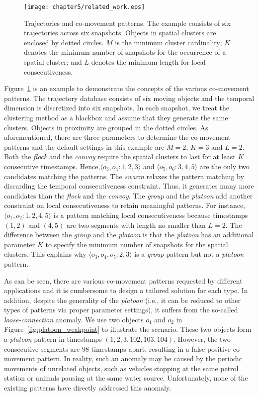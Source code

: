 \begin{figure}[h]
\centering
\texttt{[image: chapter5/related\_work.eps]}
\caption{Trajectories and co-movement patterns. The example consists of six trajectories across six snapshots. Objects in spatial clusters are enclosed by dotted circles. $M$ is the minimum cluster cardinality; $K$ denotes the minimum number of snapshots for the occurrence of a spatial cluster; and $L$ denotes the minimum length for local consecutiveness.}
\label{fig:related_work}
\end{figure}

Figure~\ref{fig:related_work} is an example to demonstrate the concepts of the various co-movement patterns. The trajectory database consists of six moving objects and the temporal dimension is discretized into six snapshots. In each snapshot, we treat the clustering method as a blackbox and assume that they generate the same clusters. Objects in proximity are grouped in the dotted circles. As aforementioned, there are three parameters to determine the co-movement patterns and the default settings in this example are $M=2$, $K=3$ and $L=2$. Both the \emph{flock} and the \emph{convoy} require the spatial clusters to last for at least $K$ consecutive  timestamps. Hence,$\langle o_3,o_4:1,2,3 \rangle$ and $\langle o_5,o_6:3,4,5 \rangle$  are the only two candidates matching the patterns. The \textit{swarm} relaxes the pattern matching by discarding the temporal consecutiveness constraint. Thus, it generates many more candidates than the \textit{flock} and the \textit{convoy}. The \textit{group} and the \textit{platoon} add another constraint on local consecutiveness to retain meaningful patterns. For instance, $\langle o_1,o_2:1,2,4,5 \rangle$ is a pattern matching local consecutiveness because timestamps $(1,2)$ and $(4,5)$ are two segments with length no smaller than $L=2$. The difference between the \textit{group} and the \textit{platoon} is that the \textit{platoon} has an additional parameter $K$ to specify the minimum number of snapshots for the spatial clusters. This explains why $\langle o_3,o_4,o_5:2,3 \rangle$ is a  \textit{group} pattern but not a \textit{platoon} pattern.

As can be seen, there are various co-movement patterns requested by different applications and it is cumbersome to design a tailored solution for each type. In addition, despite the generality of the \emph{platoon} (i.e., it can be reduced to other types of patterns via proper parameter settings), it suffers from the so-called \emph{loose-connection} anomaly. We use two objects $o_1$ and $o_2$ in Figure~\ref{fig:platoon_weakpoint} to illustrate the scenario. These two objects form a \emph{platoon} pattern in timestamps $(1,2,3,102,103,104)$. However, the two consecutive segments are $98$ timestamps apart, resulting in a false positive co-movement pattern. In reality, such an anomaly may be caused  by the periodic movements of unrelated objects, such as vehicles stopping at the same petrol station or animals pausing at the same water source. 
Unfortunately, none of the existing patterns have directly addressed this anomaly.

